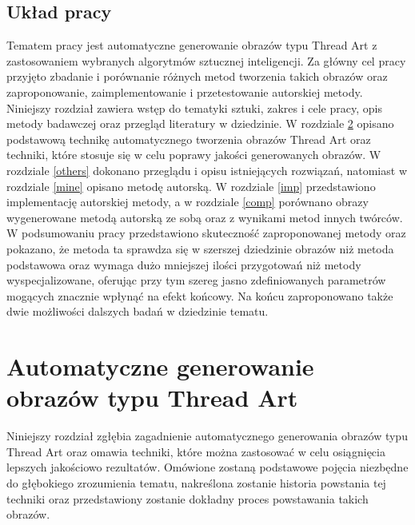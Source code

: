     \section{Układ pracy} \label{intro-layout}
    Tematem pracy jest automatyczne generowanie obrazów typu Thread Art z zastosowaniem wybranych algorytmów sztucznej inteligencji. Za główny cel pracy przyjęto zbadanie i porównanie różnych metod tworzenia takich obrazów oraz zaproponowanie, zaimplementowanie i przetestowanie autorskiej metody. Niniejszy rozdział zawiera wstęp do tematyki sztuki, zakres i cele pracy, opis metody badawczej oraz przegląd literatury w dziedzinie. W rozdziale \ref{theory} opisano podstawową technikę automatycznego tworzenia obrazów Thread Art oraz techniki, które stosuje się w celu poprawy jakości generowanych obrazów. W rozdziale \ref{others} dokonano przeglądu i opisu istniejących rozwiązań, natomiast w rozdziale \ref{mine} opisano metodę autorską. W rozdziale \ref{imp} przedstawiono implementację autorskiej metody, a w rozdziale \ref{comp} porównano obrazy wygenerowane metodą autorską ze sobą oraz z wynikami metod innych twórców. W podsumowaniu pracy przedstawiono skuteczność zaproponowanej metody oraz pokazano, że metoda ta sprawdza się w szerszej dziedzinie obrazów niż metoda podstawowa oraz wymaga dużo mniejszej ilości przygotowań niż metody wyspecjalizowane, oferując przy tym szereg jasno zdefiniowanych parametrów mogących znacznie wpłynąć na efekt końcowy. Na końcu zaproponowano także dwie możliwości dalszych badań w dziedzinie tematu. 

\chapter{Automatyczne generowanie obrazów typu Thread Art} \label{theory}
Niniejszy rozdział zgłębia zagadnienie automatycznego generowania obrazów typu Thread Art oraz omawia techniki, które można zastosować w celu osiągnięcia lepszych jakościowo rezultatów. Omówione zostaną podstawowe pojęcia niezbędne do głębokiego zrozumienia tematu, nakreślona zostanie historia powstania tej techniki oraz przedstawiony zostanie dokładny proces powstawania takich obrazów.
